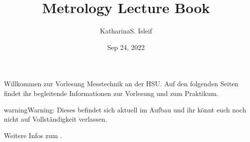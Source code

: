 \documentclass[letterpaper,10pt,english]{jupyterBook}
\title{Metrology Lecture Book}
\date{Sep 24, 2022}
\author{Katharina\sphinxhyphen{}S.\@{} Isleif}
\begin{document}
\pagestyle{empty}
\sphinxmaketitle
\pagestyle{plain}
\sphinxtableofcontents
\pagestyle{normal}
\label{\detokenize{intro::doc}}


\sphinxAtStartPar
Willkommen zur Vorlesung Messtechnik an der HSU. Auf den folgenden Seiten findet ihr begleitende Informationen zur Vorlesung und zum Praktikum.

\begin{sphinxadmonition}{warning}{Warning:}
\sphinxAtStartPar
Dieses  befindet sich aktuell im Aufbau und ihr könnt euch noch nicht auf Vollständigkeit verlassen.
\end{sphinxadmonition}


\nopagebreak


\sphinxAtStartPar
Weitere Infos zum {\hyperref[\detokenize{content/00_jupyter::doc}]{}}.
\end{document}
